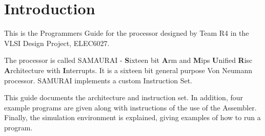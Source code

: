 
\section{Introduction}


This is the Programmers Guide for the processor designed by Team R4 in the VLSI Design Project, ELEC6027. 

The processor is called SAMAURAI - \textbf{S}ixteen bit \textbf{A}rm and \textbf{M}ips \textbf{U}nified \textbf{R}isc \textbf{A}rchitecture with \textbf{I}nterrupts.
It is a sixteen bit general purpose Von Neumann processor. 
SAMURAI implements a custom Instruction Set. 

This guide documents the architecture and instruction set. 
In addition, four example programs are given along with instructions of the use of the Assembler. 
Finally, the simulation environment is explained, giving examples of how to run a program. 
